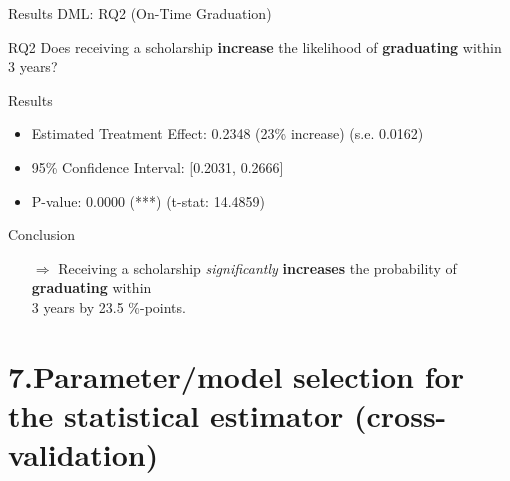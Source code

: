 \documentclass[aspectratio=169]{beamer}
\begin{document}
\begin{frame}{Results DML: RQ2 (On-Time Graduation)}
\vspace{20pt}
\begin{alertblock}{RQ2}
	Does receiving a scholarship \textbf{increase} the likelihood of \textbf{graduating} within 3 years?
\end{alertblock}

\begin{block}{Results}
\begin{itemize}[label=--,itemsep=1pt,topsep=2pt]
	\item Estimated Treatment Effect: 0.2348 (23\% increase) (s.e. 0.0162)
	\item 95\% Confidence Interval: [0.2031, 0.2666]
	\item P-value: 0.0000 (***) (t-stat: 14.4859)
\end{itemize}
\end{block}

\begin{exampleblock}{Conclusion}
\vspace{-3pt}
\begin{itemize}
	\item [$\Rightarrow$]Receiving a scholarship \textit{significantly} \textbf{increases} the probability of \textbf{graduating} within \\ 3 years by 23.5 \%-points.
\end{itemize}
\vspace{-3pt}
	
\end{exampleblock}

\end{frame}




\section{7.Parameter/model selection for the statistical estimator (cross-validation)}
\end{document}
